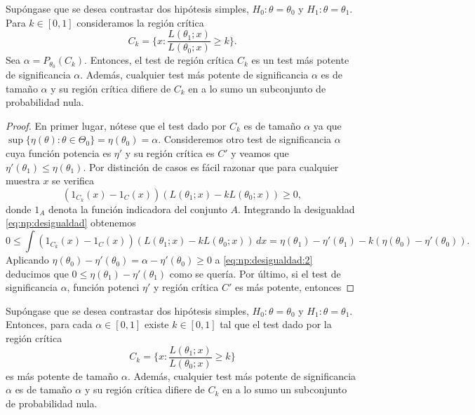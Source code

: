 \documentclass{article}
\begin{document}
\begin{thm}
    Supóngase que se desea contrastar dos hipótesis simples, $H_0 : \theta = \theta_0$ y $H_1 : \theta = \theta_1$. Para $k \in [0,1]$ consideramos la región crítica
    \[C_k = \{x: \frac{L(\theta_1;x)}{L(\theta_0;x)} \ge k\}.\]
    Sea $\alpha = P_{\theta_0}(C_k)$. Entonces, el test de región crítica $C_k$ es un test más potente de significancia $\alpha$. Además, cualquier test más potente de significancia $\alpha$ es de tamaño $\alpha$ y su región crítica difiere de $C_k$ en a lo sumo un subconjunto de probabilidad nula.
\end{thm}
\begin{proof}
    En primer lugar, nótese que el test dado por $C_k$ es de tamaño $\alpha$ ya que $\sup\{ \eta(\theta) : \theta \in \Theta_0\} = \eta(\theta_0) = \alpha$. Consideremos otro test de significancia $\alpha$ cuya función potencia es $\eta'$ y su región crítica es $C'$ y veamos que $\eta'(\theta_1) \le \eta(\theta_1)$. Por distinción de casos es fácil razonar que para cualquier muestra $x$ se verifica
    \begin{equation} \label{eq:np:desigualdad}
        (1_{C_k}(x)-1_C(x)) (L(\theta_1; x) - k L(\theta_0; x)) \ge 0,
    \end{equation}
    donde $1_A$ denota la función indicadora del conjunto $A$. Integrando la desigualdad \eqref{eq:np:desigualdad} obtenemos
    \begin{equation} \label{eq:np:desigualdad:2}
        0 \le \int(1_{C_k}(x)-1_C(x)) (L(\theta_1; x) - k L(\theta_0; x)) \, dx = \eta(\theta_1) - \eta'(\theta_1) - k (\eta(\theta_0) - \eta'(\theta_0)).
    \end{equation}
    Aplicando $\eta(\theta_0) - \eta'(\theta_0) = \alpha  - \eta'(\theta_0) \ge 0$ a \eqref{eq:np:desigualdad:2} deducimos que $0 \le \eta(\theta_1) - \eta'(\theta_1)$ como se quería. Por último, si el test de significancia $\alpha$, función potenci $\eta'$ y región crítica $C'$ es más potente, entonces
\end{proof}

\begin{cor}
    Supóngase que se desea contrastar dos hipótesis simples, $H_0 : \theta = \theta_0$ y $H_1 : \theta = \theta_1$. Entonces, para cada $\alpha \in [0,1]$ existe $k \in [0,1]$ tal que el test dado por la región crítica
    \[C_k = \{x: \frac{L(\theta_1;x)}{L(\theta_0;x)} \ge k\}\]
    es más potente de tamaño $\alpha$. Además, cualquier test más potente de significancia $\alpha$ es de tamaño $\alpha$ y su región crítica difiere de $C_k$ en a lo sumo un subconjunto de probabilidad nula.
\end{cor}
\end{document}
